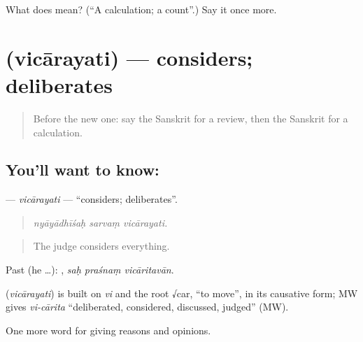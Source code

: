 \begin{tcolorbox}[breakable,colback=teal!4,colframe=teal!35!black,title={Before you move on}]
What does  mean? (\textquotedblleft{}A calculation; a count\textquotedblright{}.) Say it once more.
\end{tcolorbox}
\section[\texorpdfstring{\sk{विचारयति} (vicārayati)}{विचारयति (vicārayati)}]{ (vicārayati) — considers; deliberates}

\label{lesson:SA-C366-vicarayati}



\begin{quote}
Before the new one: say the Sanskrit for a review, then the Sanskrit for a calculation.
\end{quote}

\subsection*{You'll want to know: }
\textbf{} — \emph{vicārayati} — \textquotedblleft{}considers; deliberates\textquotedblright{}.

\begin{quote}
  
\end{quote}

\begin{quote}
\emph{nyāyādhīśaḥ sarvaṃ vicārayati.}
\end{quote}

\begin{quote}
The judge considers everything.
\end{quote}

Past (he …):   , \emph{saḥ praśnaṃ vicāritavān}.

\begin{cousinweb}
\textbf{} (\emph{vicārayati}) is built on \emph{vi} and the root √car, \textquotedblleft{}to move\textquotedblright{}, in its causative form; MW gives \emph{vi-cārita} \textquotedblleft{}deliberated, considered, discussed, judged\textquotedblright{} (MW).
\end{cousinweb}

\begin{grammarlens}[title={What you've built}]
One more word for giving reasons and opinions.
\end{grammarlens}

